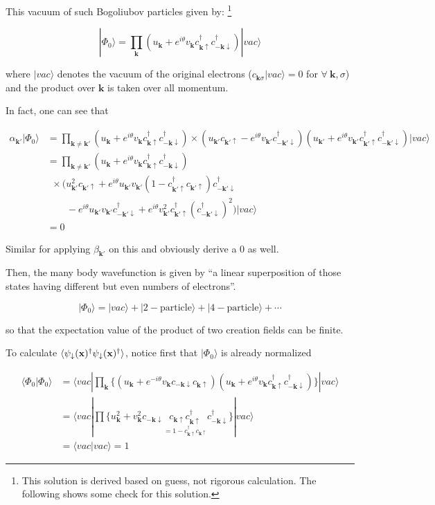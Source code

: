 ﻿\documentclass[twoside]{book}
\numberwithin{equation}{section}
\begin{document}
This vacuum of such Bogoliubov particles given by: \footnote{This solution is derived based on guess, not rigorous calculation. The following shows some check for this solution. }

\[|\Phi_0\rangle = \prod_{\bm{k}}(u_{\bm{k}}+e^{i\theta}v_{\bm{k}}c_{\bm{k}\uparrow}^\dagger c_{-\bm{k}\downarrow}^\dagger)|vac\rangle \]

where $|vac\rangle$ denotes the vacuum of the original electrons ($c_{\bm{k}\sigma}|vac\rangle = 0$ for $\forall\ \bm{k},\sigma$) and the product over $\bm{k}$ is taken over all momentum. 

In fact, one can see that 

\[
\begin{split}
\alpha_{\bm{k}'}|\Phi_0\rangle &= \prod_{\bm{k} \neq \bm{k}'} (u_{\bm{k}}+e^{i\theta}v_{\bm{k}}c_{\bm{k}\uparrow}^\dagger c_{-\bm{k}\downarrow}^\dagger)\times( u_{\bm{k}'}c_{\bm{k}'\uparrow} - e^{i\theta}v_{\bm{k}'}c_{-\bm{k}'\downarrow}^\dagger)(u_{\bm{k}'}+e^{i\theta}v_{\bm{k}'}c_{\bm{k}'\uparrow}^\dagger c_{-\bm{k}'\downarrow}^\dagger)|vac\rangle \\
&=\prod_{\bm{k}\neq\bm{k}'}(u_{\bm{k}}+e^{i\theta}v_{\bm{k}}c_{\bm{k}\uparrow}^\dagger c_{-\bm{k}\downarrow}^\dagger)\\
&\ \ \times (u_{\bm{k}'}^2c_{\bm{k}'\uparrow}+e^{i\theta}u_{\bm{k}'}v_{\bm{k}'}(1-c_{\bm{k}'\uparrow}^\dagger c_{\bm{k}'\uparrow})c_{-\bm{k}'\downarrow}^\dagger\\
&\quad\quad -e^{i\theta}u_{\bm{k}'}v_{\bm{k}'}c_{-\bm{k}'\downarrow}^\dagger + e^{i\theta}v_{\bm{k}'}^2c_{\bm{k}'\uparrow}^\dagger(c_{-\bm{k}'\downarrow}^\dagger)^2)|vac\rangle\\
&=0
\end{split}\]

Similar for applying $\beta_{\bm{k}'}$ on this and obviously derive a $0$ as well. 

Then, the many body wavefunction is given by ``a linear superposition of those states having different but even numbers of electrons''. 

\[|\Phi_0\rangle = |vac\rangle + |2-\text{particle}\rangle + |4-\text{particle}\rangle+\cdots \]

so that the expectation value of the product of two creation fields can be finite. 

To calculate $\langle\psi_{\downarrow}(\bf{x})^\dagger\psi_{\downarrow}(\bf{x})^\dagger\rangle$, notice first that $|\Phi_0\rangle$ is already normalized

\[\begin{split}
\langle\Phi_0|\Phi_0\rangle &= \langle vac| \prod_{\bm{k}}\{(u_{\bm{k}}+e^{-i\theta}v_{\bm{k}}c_{-\bm{k}\downarrow}c_{\bm{k}\uparrow})(u_{\bm{k}}+e^{i\theta}v_{\bm{k}}c_{\bm{k}\uparrow}^\dagger c_{-\bm{k}\downarrow}^\dagger)\}|vac\rangle\\
&= \langle vac|\prod\{u_{\bm{k}}^2+v_{\bm{k}}^2c_{-\bm{k}\downarrow}\underset{=1-c_{\bm{k}\uparrow}^\dagger c_{\bm{k}\uparrow}}{c_{\bm{k}\uparrow}c_{\bm{k}\uparrow}^\dagger} c_{-\bm{k}\downarrow}^\dagger\}|vac\rangle\\
&=\langle vac|vac\rangle = 1
\end{split}\]
\end{document}
